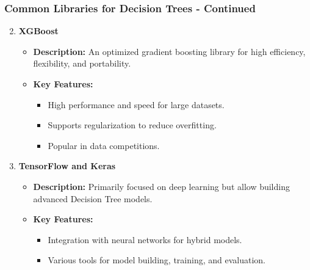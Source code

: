 \documentclass[aspectratio=169]{beamer}
\begin{document}
\begin{frame}[fragile]
    \frametitle{Common Libraries for Decision Trees - Continued}
    \begin{enumerate}
        \setcounter{enumi}{1} %
        \item \textbf{XGBoost}
        \begin{itemize}
            \item \textbf{Description:} An optimized gradient boosting library for high efficiency, flexibility, and portability.
            \item \textbf{Key Features:}
            \begin{itemize}
                \item High performance and speed for large datasets.
                \item Supports regularization to reduce overfitting.
                \item Popular in data competitions.
            \end{itemize}
        \end{itemize}
        
        \item \textbf{TensorFlow and Keras}
        \begin{itemize}
            \item \textbf{Description:} Primarily focused on deep learning but allow building advanced Decision Tree models.
            \item \textbf{Key Features:}
            \begin{itemize}
                \item Integration with neural networks for hybrid models.
                \item Various tools for model building, training, and evaluation.
            \end{itemize}
        \end{itemize}
    \end{enumerate}
\end{frame}
\end{document}
